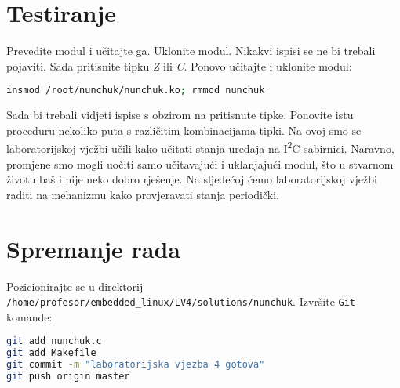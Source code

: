 \documentclass[11pt]{article}
\begin{document}
\section{Testiranje}
Prevedite modul i učitajte ga. Uklonite modul. Nikakvi ispisi se ne bi trebali
pojaviti. Sada pritisnite tipku \textit{Z} ili \textit{C}. Ponovo učitajte i
uklonite modul:
\begin{lstlisting}[language=bash]
insmod /root/nunchuk/nunchuk.ko; rmmod nunchuk
\end{lstlisting}
Sada bi trebali vidjeti ispise s obzirom na pritisnute tipke. Ponovite istu
proceduru nekoliko puta s različitim kombinacijama tipki.
\newline
\newline
Na ovoj smo se laboratorijskoj vježbi učili kako učitati stanja uređaja na
I\textsuperscript{2}C sabirnici. Naravno, promjene smo mogli uočiti samo
učitavajući i uklanjajući modul, što u stvarnom životu baš i nije neko dobro
rješenje. Na sljedećoj ćemo laboratorijskoj vježbi raditi na mehanizmu kako
provjeravati stanja periodički.

\section{Spremanje rada}
Pozicionirajte se u direktorij \texttt{/home/profesor/embedded\_linux/LV4/solutions/nunchuk}.
Izvršite \texttt{Git} komande:
\begin{lstlisting}[language=bash]
git add nunchuk.c
git add Makefile
git commit -m "laboratorijska vjezba 4 gotova"
git push origin master
\end{lstlisting}
\end{document}

